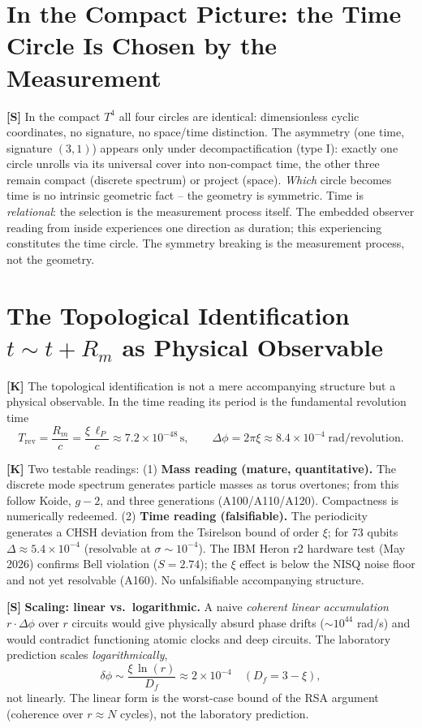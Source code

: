 \section{In the Compact Picture: the Time Circle Is Chosen by the Measurement}

\textbf{[S]} In the compact $T^4$ all four circles are identical: dimensionless
cyclic coordinates, no signature, no space/time distinction. The asymmetry (one
time, signature $(3,1)$) appears only under decompactification (type I): exactly
one circle unrolls via its universal cover into non-compact time, the other three
remain compact (discrete spectrum) or project (space). \emph{Which} circle becomes
time is no intrinsic geometric fact -- the geometry is symmetric. Time is
\emph{relational}: the selection is the measurement process itself. The embedded
observer reading from inside experiences one direction as duration; this
experiencing constitutes the time circle. The symmetry breaking is the measurement
process, not the geometry.

\section{The Topological Identification $t\sim t+R_m$ as Physical Observable}

\textbf{[K]} The topological identification is not a mere accompanying structure
but a physical observable. In the time reading its period is the fundamental
revolution time
\[
  T_\text{rev} = \frac{R_m}{c} = \frac{\xi\,\ell_P}{c}\approx 7{.}2\times10^{-48}\,\text{s},
  \qquad \Delta\phi = 2\pi\xi\approx 8{.}4\times10^{-4}\;\text{rad/revolution}.
\]

\textbf{[K]} Two testable readings: (1) \textbf{Mass reading (mature,
quantitative).} The discrete mode spectrum generates particle masses as torus
overtones; from this follow Koide, $g-2$, and three generations (A100/A110/A120).
Compactness is numerically redeemed. (2) \textbf{Time reading (falsifiable).}
The periodicity generates a CHSH deviation from the Tsirelson bound of order $\xi$;
for 73 qubits $\Delta\approx5{.}4\times10^{-4}$ (resolvable at $\sigma\sim10^{-4}$).
The IBM Heron r2 hardware test (May 2026) confirms Bell violation ($S=2{.}74$); the
$\xi$ effect is below the NISQ noise floor and not yet resolvable (A160). No
unfalsifiable accompanying structure.

\textbf{[S]} \textbf{Scaling: linear vs.\ logarithmic.} A naive \emph{coherent
linear accumulation} $r\cdot\Delta\phi$ over $r$ circuits would give physically
absurd phase drifts ($\sim10^{44}$ rad/s) and would contradict functioning atomic
clocks and deep circuits. The laboratory prediction scales \emph{logarithmically},
\[
  \delta\phi\sim\frac{\xi\,\ln(r)}{D_f}\approx2\times10^{-4}
  \quad (D_f=3-\xi),
\]
not linearly. The linear form is the worst-case bound of the RSA argument
(coherence over $r\approx N$ cycles), not the laboratory prediction.

